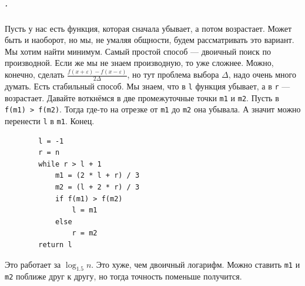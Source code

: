 \documentclass{article}
\newcommand{\pseudo}{PseudoLexer.py:PseudoLexer -x}
\newcommand{\pseudocode}[1]{\texttt{#1}}
\begin{document}
    \subparagraph{.}
    Пусть у нас есть функция, которая сначала убывает, а потом возрастает. Может быть и наоборот, но мы, не умаляя общности, будем рассматривать это вариант. Мы хотим найти минимум. Самый простой способ --- двоичный поиск по производной. Если же мы не знаем производную, то уже сложнее. Можно, конечно, сделать $\frac{f(x+\varepsilon)-f(x-\varepsilon)}{2\Delta}$, но тут проблема выбора $\Delta$, надо очень много думать. Есть стабильный способ. Мы знаем, что в \pseudocode{l} функция убывает, а в \pseudocode{r} --- возрастает. Давайте воткнёмся в две промежуточные точки \pseudocode{m1} и \pseudocode{m2}. Пусть в \pseudocode{f(m1) > f(m2)}. Тогда где-то на отрезке от \pseudocode{m1} до \pseudocode{m2} она убывала. А значит можно перенести \pseudocode{l} в \pseudocode{m1}. Конец.
    \begin{verbatim}
        l = -1
        r = n
        while r > l + 1
            m1 = (2 * l + r) / 3
            m2 = (l + 2 * r) / 3
            if f(m1) > f(m2)
                l = m1
            else
                r = m2
        return l
    \end{verbatim}
    Это работает за $\log_{1.5}n$. Это хуже, чем двоичный логарифм. Можно ставить \pseudocode{m1} и \pseudocode{m2} поближе друг к другу, но тогда точность поменьше получится.
\end{document}
